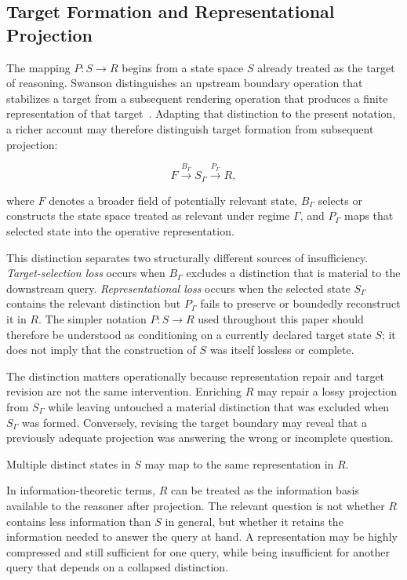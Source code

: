\documentclass[11pt]{article}
\begin{document}
\subsection{Target Formation and Representational Projection}

The mapping \(P:S\rightarrow R\) begins from a state space \(S\) already treated as the target of reasoning. Swanson distinguishes an upstream boundary operation that stabilizes a target from a subsequent rendering operation that produces a finite representation of that target~\cite{Swanson2026Monist}. Adapting that distinction to the present notation, a richer account may therefore distinguish target formation from subsequent projection:

\[
F \xrightarrow{B_{\Gamma}} S_{\Gamma}
  \xrightarrow{P_{\Gamma}} R,
\]

where \(F\) denotes a broader field of potentially relevant state, \(B_{\Gamma}\) selects or constructs the state space treated as relevant under regime \(\Gamma\), and \(P_{\Gamma}\) maps that selected state into the operative representation.

This distinction separates two structurally different sources of insufficiency. \emph{Target-selection loss} occurs when \(B_{\Gamma}\) excludes a distinction that is material to the downstream query. \emph{Representational loss} occurs when the selected state \(S_{\Gamma}\) contains the relevant distinction but \(P_{\Gamma}\) fails to preserve or boundedly reconstruct it in \(R\). The simpler notation \(P:S\rightarrow R\) used throughout this paper should therefore be understood as conditioning on a currently declared target state \(S\); it does not imply that the construction of \(S\) was itself lossless or complete.

The distinction matters operationally because representation repair and target revision are not the same intervention. Enriching \(R\) may repair a lossy projection from \(S_{\Gamma}\) while leaving untouched a material distinction that was excluded when \(S_{\Gamma}\) was formed. Conversely, revising the target boundary may reveal that a previously adequate projection was answering the wrong or incomplete question.

Multiple distinct states in $S$ may map to the same representation in $R$.

In information-theoretic terms, $R$ can be treated as the information basis available to the reasoner after projection. The relevant question is not whether $R$ contains less information than $S$ in general, but whether it retains the information needed to answer the query at hand. A representation may be highly compressed and still sufficient for one query, while being insufficient for another query that depends on a collapsed distinction.
\end{document}
